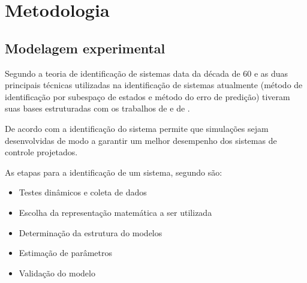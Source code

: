 
\chapter{Metodologia}
\label{ch:metodologia}

\section{Modelagem experimental}
\label{sec:modelagem_experimental}

Segundo  a teoria de identificação de sistemas data da década de 60 e as duas
principais técnicas utilizadas na identificação de sistemas atualmente (método de identificação por
subespaço de estados e método do erro de predição) tiveram suas bases estruturadas com os trabalhos
de  e de .

De acordo com  a identificação do sistema permite que simulações
sejam desenvolvidas de modo a garantir um melhor desempenho dos sistemas de controle projetados.

As etapas para a identificação de um sistema, segundo  são:
\begin{itemize}
    \item Testes dinâmicos e coleta de dados
    \item Escolha da representação matemática a ser utilizada
    \item Determinação da estrutura do modelos
    \item Estimação de parâmetros
    \item Validação do modelo
\end{itemize}

